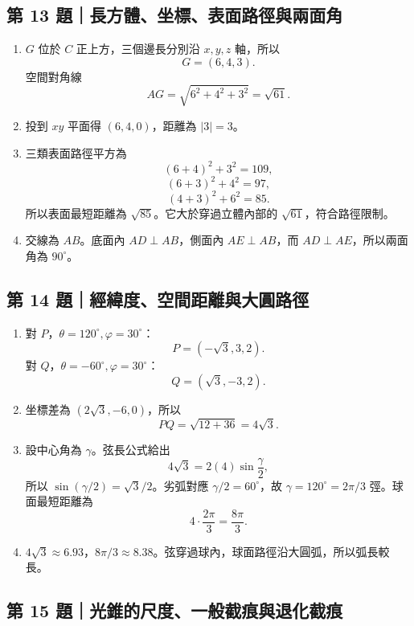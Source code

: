 \documentclass[11pt,a4paper]{article}
\providecommand{\tightlist}{%
  \setlength{\itemsep}{0pt}\setlength{\parskip}{0pt}}
\begin{document}
\subsection{第 13 題｜長方體、坐標、表面路徑與兩面角}\label{ux7b2c-13-ux984cux9577ux65b9ux9ad4ux5750ux6a19ux8868ux9762ux8defux5f91ux8207ux5169ux9762ux89d2}

\begin{enumerate}
\def\labelenumi{\arabic{enumi}.}
\tightlist
\item
  \(G\) 位於 \(C\) 正上方，三個邊長分別沿 \(x,y,z\) 軸，所以
  \[
  G=(6,4,3).
  \]
  空間對角線
  \[
  AG=\sqrt{6^2+4^2+3^2}=\sqrt{61}.
  \]
\item
  投到 \(xy\) 平面得 \((6,4,0)\)，距離為 \(|3|=3\)。
\item
  三類表面路徑平方為
  \[
  (6+4)^2+3^2=109,
  \]
  \[
  (6+3)^2+4^2=97,
  \]
  \[
  (4+3)^2+6^2=85.
  \]
  所以表面最短距離為 \(\sqrt{85}\)。它大於穿過立體內部的 \(\sqrt{61}\)，符合路徑限制。
\item
  交線為 \(AB\)。底面內 \(AD\perp AB\)，側面內 \(AE\perp AB\)，而 \(AD\perp AE\)，所以兩面角為 \(90^\circ\)。
\end{enumerate}

\subsection{第 14 題｜經緯度、空間距離與大圓路徑}\label{ux7b2c-14-ux984cux7d93ux7defux5ea6ux7a7aux9593ux8dddux96e2ux8207ux5927ux5713ux8defux5f91}

\begin{enumerate}
\def\labelenumi{\arabic{enumi}.}
\tightlist
\item
  對 \(P\)，\(\theta=120^\circ,\varphi=30^\circ\)：
  \[
  P=(-\sqrt3,3,2).
  \]
  對 \(Q\)，\(\theta=-60^\circ,\varphi=30^\circ\)：
  \[
  Q=(\sqrt3,-3,2).
  \]
\item
  坐標差為 \((2\sqrt3,-6,0)\)，所以
  \[
  PQ=\sqrt{12+36}=4\sqrt3.
  \]
\item
  設中心角為 \(\gamma\)。弦長公式給出
  \[
  4\sqrt3=2(4)\sin\frac\gamma2,
  \]
  所以 \(\sin(\gamma/2)=\sqrt3/2\)。劣弧對應 \(\gamma/2=60^\circ\)，故 \(\gamma=120^\circ=2\pi/3\) 弳。球面最短距離為
  \[
  4\cdot\frac{2\pi}{3}=\frac{8\pi}{3}.
  \]
\item
  \(4\sqrt3\approx6.93\)，\(8\pi/3\approx8.38\)。弦穿過球內，球面路徑沿大圓弧，所以弧長較長。
\end{enumerate}

\subsection{第 15 題｜光錐的尺度、一般截痕與退化截痕}\label{ux7b2c-15-ux984cux5149ux9310ux7684ux5c3aux5ea6ux4e00ux822cux622aux75d5ux8207ux9000ux5316ux622aux75d5}
\end{document}
